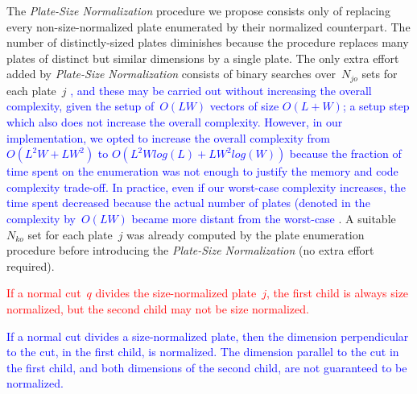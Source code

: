 \documentclass[smallextended]{svjour3}       %
\newif\iffinalversion
\newcommand{\newtext}[1]{\iffinalversion%
#1%
\else%
\textcolor{blue}{#1}%
\fi%
}
\newcommand{\oldtext}[1]{\iffinalversion%
\else%
\textcolor{red}{#1}%
\fi%
}
\begin{document}
The \emph{Plate-Size Normalization} procedure we propose consists only of replacing every non-size-normalized plate enumerated by their normalized counterpart.
The number of distinctly-sized plates diminishes because the procedure replaces many plates of distinct but similar dimensions by a single plate.
The only extra effort added by \emph{Plate-Size Normalization} consists of binary searches over~\(N_{jo}\) sets for each plate~\(j\)\newtext{, and these may be carried out without increasing the overall complexity, given the setup of~\(O(LW)\) vectors of size \(O(L + W)\); a setup step which also does not increase the overall complexity. However, in our implementation, we opted to increase the overall complexity from \(O(L^2W + LW^2)\) to \(O(L^2Wlog(L) + LW^2log(W))\) because the fraction of time spent on the enumeration was not enough to justify the memory and code complexity trade-off. In practice, even if our worst-case complexity increases, the time spent decreased because the actual number of plates (denoted in the complexity by~\(O(LW)\) became more distant from the worst-case}.
A suitable \(N_{ko}\) set for each plate~\(j\) was already computed by the plate enumeration procedure before introducing the \emph{Plate-Size Normalization} (no extra effort required).

\begin{remark}
\oldtext{If a normal cut~\(q\) divides the size-normalized plate~\(j\), the first child is always size normalized, but the second child may not be size normalized.}
\newtext{If a normal cut divides a size-normalized plate, then the dimension perpendicular to the cut, in the first child, is normalized. The dimension parallel to the cut in the first child, and both dimensions of the second child, are not guaranteed to be normalized.}
\end{remark}



\end{document}
